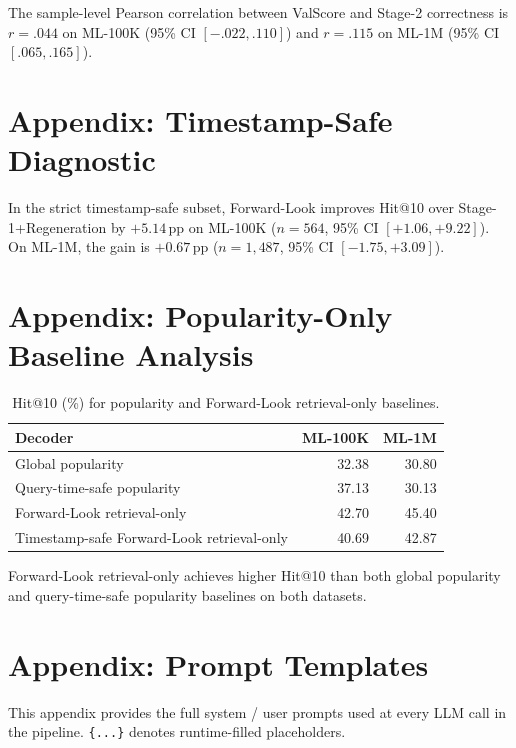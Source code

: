 \documentclass[11pt]{article}
\begin{document}
The sample-level Pearson correlation between ValScore and Stage-2 correctness is $r=.044$ on ML-100K (95\% CI $[-.022,.110]$) and $r=.115$ on ML-1M (95\% CI $[.065,.165]$).

\section{Appendix: Timestamp-Safe Diagnostic}
\label{app:timestamp}

In the strict timestamp-safe subset, Forward-Look improves Hit@10 over Stage-1+Regeneration by $+5.14$\,pp on ML-100K ($n=564$, 95\% CI $[+1.06,+9.22]$). On ML-1M, the gain is $+0.67$\,pp ($n=1{,}487$, 95\% CI $[-1.75,+3.09]$).

\section{Appendix: Popularity-Only Baseline Analysis}
\label{app:popularity}

\begin{table}[t]
\centering
\small
\setlength{\tabcolsep}{3pt}
\begin{tabularx}{\columnwidth}{@{}>{\raggedright\arraybackslash}Xrr@{}}
\toprule
\textbf{Decoder} & \textbf{ML-100K} & \textbf{ML-1M} \\
\midrule
Global popularity & 32.38 & 30.80 \\
Query-time-safe popularity & 37.13 & 30.13 \\
Forward-Look retrieval-only & 42.70 & 45.40 \\
Timestamp-safe Forward-Look retrieval-only & 40.69 & 42.87 \\
\bottomrule
\end{tabularx}
\caption{Hit@10 (\%) for popularity and Forward-Look retrieval-only baselines.}
\label{tab:popularity}
\end{table}

Forward-Look retrieval-only achieves higher Hit@10 than both global popularity and query-time-safe popularity baselines on both datasets.

\section{Appendix: Prompt Templates}
\label{app:prompts}

This appendix provides the full system / user prompts used at every
LLM call in the pipeline. \texttt{\{...\}} denotes runtime-filled
placeholders.
\end{document}
